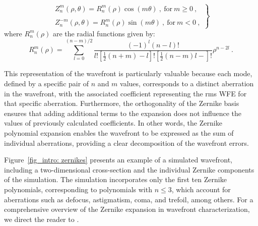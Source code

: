 \begin{equation}
  \left.
  \begin{array}{l}
  Z _ n ^m (\rho, \theta) = R _ n ^m (\rho) \cos (m\theta)\ , \ \text{for} \ m \geqslant 0 \ ,\\
  \\
  Z _ n ^{-m} (\rho, \theta) = R _ n ^m (\rho) \sin (m\theta) \ , \ \text{for}  \ m < 0 \ ,
  \end{array}
  \right\}
\end{equation}
where $R _ n ^m (\rho)$ are the radial functions given by:
\begin{equation}
  R_n^m(\rho)=\sum_{l=0}^{(n-m) / 2} \frac{(-1)^l(n-l)!}{l!\left[\frac{1}{2}(n+m)-l\right]!\left[\frac{1}{2}(n-m)l-\right]!}\rho ^{n - 2l} \ .
\end{equation}

This representation of the wavefront is particularly valuable because each mode, defined by a specific pair of $n$ and $m$ values, corresponds to a distinct aberration in the wavefront, with the associated coefficient representing the rms WFE for that specific aberration. Furthermore, the orthogonality of the Zernike basis ensures that adding additional terms to the expansion does not influence the values of previously calculated coefficients. In other words, the Zernike polynomial expansion enables the wavefront to be expressed as the sum of individual aberrations, providing a clear decomposition of the wavefront errors.

Figure~\ref{fig_intro: zernikes} presents an example of a simulated wavefront, including a two-dimensional cross-section and the individual Zernike components of the simulation. The simulation incorporates only the first ten Zernike polynomials, corresponding to polynomials with $n \leqslant 3$, which account for aberrations such as defocus, astigmatism, coma, and trefoil, among others. For a comprehensive overview of the Zernike expansion in wavefront characterization, we direct the reader to \citet{Zernike_guide}.

